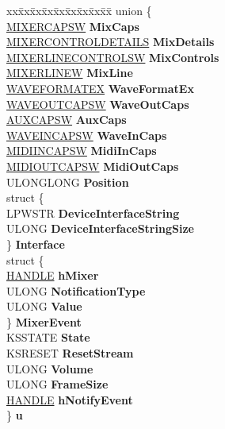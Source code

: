 \begin{DoxyCompactItemize}
\item 
\mbox{\label{struct_w_d_m_a_u_d___d_e_v_i_c_e___i_n_f_o_a14384693b616b270d6448d35306d8946}} 
\begin{tabbing}
xx\=xx\=xx\=xx\=xx\=xx\=xx\=xx\=xx\=\kill
union \{\\
\>\hyperlink{structtag_m_i_x_e_r_c_a_p_s_w}{MIXERCAPSW} {\bfseries MixCaps}\\
\>\hyperlink{structt_m_i_x_e_r_c_o_n_t_r_o_l_d_e_t_a_i_l_s}{MIXERCONTROLDETAILS} {\bfseries MixDetails}\\
\>\hyperlink{structtag_m_i_x_e_r_l_i_n_e_c_o_n_t_r_o_l_s_w}{MIXERLINECONTROLSW} {\bfseries MixControls}\\
\>\hyperlink{structtag_m_i_x_e_r_l_i_n_e_w}{MIXERLINEW} {\bfseries MixLine}\\
\>\hyperlink{struct_w_a_v_e_f_o_r_m_a_t_e_x}{WAVEFORMATEX} {\bfseries WaveFormatEx}\\
\>\hyperlink{structtag_w_a_v_e_o_u_t_c_a_p_s_w}{WAVEOUTCAPSW} {\bfseries WaveOutCaps}\\
\>\hyperlink{structtag_a_u_x_c_a_p_s_w}{AUXCAPSW} {\bfseries AuxCaps}\\
\>\hyperlink{structtag_w_a_v_e_i_n_c_a_p_s_w}{WAVEINCAPSW} {\bfseries WaveInCaps}\\
\>\hyperlink{structtag_m_i_d_i_i_n_c_a_p_s_w}{MIDIINCAPSW} {\bfseries MidiInCaps}\\
\>\hyperlink{structtag_m_i_d_i_o_u_t_c_a_p_s_w}{MIDIOUTCAPSW} {\bfseries MidiOutCaps}\\
\>ULONGLONG {\bfseries Position}\\
\>struct \{\\
\>\>LPWSTR {\bfseries DeviceInterfaceString}\\
\>\>ULONG {\bfseries DeviceInterfaceStringSize}\\
\>\} {\bfseries Interface}\\
\>struct \{\\
\>\>\hyperlink{interfacevoid}{HANDLE} {\bfseries hMixer}\\
\>\>ULONG {\bfseries NotificationType}\\
\>\>ULONG {\bfseries Value}\\
\>\} {\bfseries MixerEvent}\\
\>KSSTATE {\bfseries State}\\
\>KSRESET {\bfseries ResetStream}\\
\>ULONG {\bfseries Volume}\\
\>ULONG {\bfseries FrameSize}\\
\>\hyperlink{interfacevoid}{HANDLE} {\bfseries hNotifyEvent}\\
\} {\bfseries u}\\

\end{tabbing}\end{DoxyCompactItemize}


